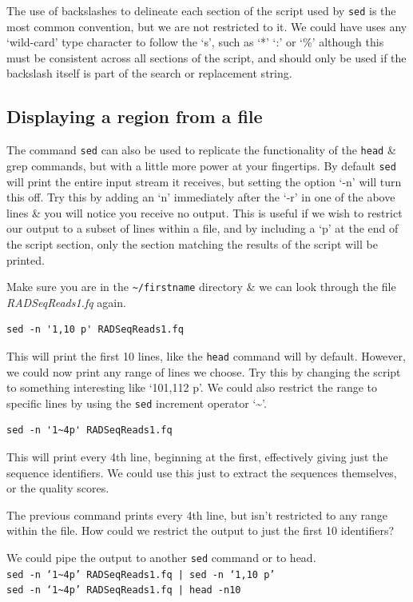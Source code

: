 \documentclass[a4paper,12pt,twoside]{memoir}
\begin{document}
\begin{information}
The use of backslashes to delineate each section of the script used by \texttt{sed} is the most common convention, but we are not restricted to it.
We could have uses any `wild-card' type character to follow the `s', such as `*' `:' or `\%' although this must be consistent across all sections of the script, and should only be used if the backslash itself is part of the search or replacement string.
\end{information}

\subsection*{Displaying a region from a file}
The command \texttt{sed} can also be used to replicate the functionality of the \texttt{head} \& grep commands, but with a little more power at your fingertips.
By default \texttt{sed} will print the entire input stream it receives, but setting the option `-n' will turn this off.
Try this by adding an `n' immediately after the `-r' in one of the above lines \& you will notice you receive no output.
This is useful if we wish to restrict our output to a subset of lines within a file, and by including a `p' at the end of the script section, only the section matching the results of the script will be printed.
\begin{steps}
Make sure you are in the \texttt{\~{}/firstname} directory \& we can look through the file \textit{RADSeqReads1.fq} again.
\begin{lstlisting}
sed -n '1,10 p' RADSeqReads1.fq
\end{lstlisting}
This will print the first 10 lines, like the \texttt{head} command will by default.
However, we could now print any range of lines we choose.
Try this by changing the script to something interesting like `101,112 p'.
We could also restrict the range to specific lines by using the \texttt{sed} increment operator `\~{}'.
\begin{lstlisting}
sed -n '1~4p' RADSeqReads1.fq
\end{lstlisting}
This will print every 4th line, beginning at the first, effectively giving just the sequence identifiers.
We could use this just to extract the sequences themselves, or the quality scores.
\end{steps}

\begin{questions}
The previous command prints every 4th line, but isn't restricted to any range within the file.
How could we restrict the output to just the first 10 identifiers? \\
\begin{answer}
We could pipe the output to another \texttt{sed} command or  to head.\\
\texttt{sed -n `1\~{}4p' RADSeqReads1.fq | sed -n `1,10 p'} \\
\texttt{sed -n `1\~{}4p' RADSeqReads1.fq | head -n10} \\
\end{answer}
\end{questions}
\end{document}
